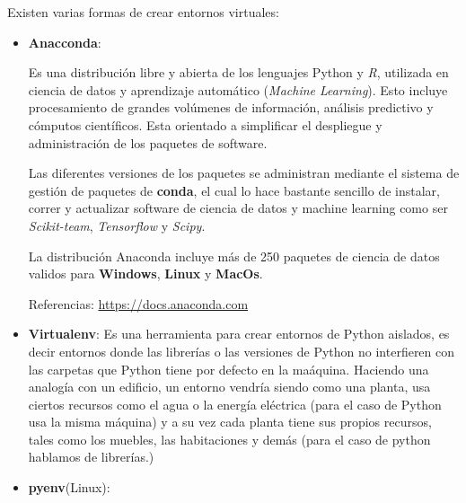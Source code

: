 \documentclass[10pt]{article}
\newcommand{\py}[1]{{\textcolor{B}{Python} #1}}
\begin{document}
Existen varias formas de crear entornos virtuales: 
\begin{itemize}
\item \textbf{Anacconda}: 

	Es una distribución libre y abierta de los lenguajes \py	 y \textit{R}, utilizada en ciencia de datos y aprendizaje automático (\textit{Machine Learning}).
Esto incluye procesamiento de grandes volúmenes de información, análisis predictivo y cómputos científicos. Esta orientado a simplificar el despliegue y administración de los paquetes de software.

Las diferentes versiones de los paquetes se administran mediante el sistema de gestión de paquetes de \textbf{conda}, el cual lo hace bastante sencillo de instalar, correr y actualizar software de ciencia de datos y machine learning como ser \textit{Scikit-team}, \textit{Tensorflow} y \textit{Scipy}.

La distribución Anaconda incluye más de 250 paquetes de ciencia de datos validos para \textbf{Windows}, \textbf{Linux} y \textbf{MacOs}.

\textcolor{R}{Referencias:} \url{https://docs.anaconda.com}

\item \textbf{Virtualenv}:
 Es una herramienta para crear entornos de \py aislados, es decir entornos donde las librerías o las versiones de \py no interfieren con las carpetas que \py tiene por defecto en la maáquina. Haciendo una analogía con un edificio, un entorno vendría siendo como una planta, usa ciertos recursos como el agua o la energía eléctrica (para el caso de \py usa la misma máquina) y a su vez cada planta tiene sus propios recursos, tales como los muebles, las habitaciones y demás (para el caso de python hablamos de librerías.)

\item \textbf{pyenv}(Linux):
\end{itemize} 
\end{document}
